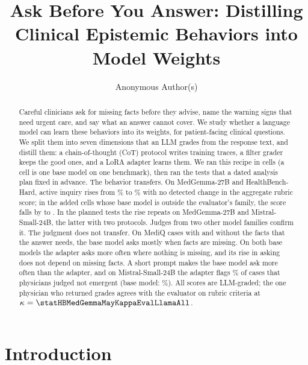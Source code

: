 \documentclass{article}
\title{Ask Before You Answer: Distilling Clinical Epistemic Behaviors into Model Weights}
\author{Anonymous Author(s)}
\newcommand{\hbhard}{HealthBench-Hard}
\begin{document}
\maketitle

\begin{abstract}
Careful clinicians ask for missing facts before they advise, name the warning signs that need
urgent care, and say what an answer cannot cover. We study whether a language model can learn these
behaviors into its weights, for patient-facing clinical questions. We split them into seven
dimensions that an LLM grades from the response text, and distill them: a chain-of-thought (CoT)
protocol writes training traces, a filter grader keeps the good ones, and a LoRA adapter learns
them. We ran this recipe in \statCrossCells{} cells (a cell is one base model on one benchmark), then
ran the tests that a dated analysis plan fixed in advance. The behavior transfers. On MedGemma-27B
and \hbhard{}, active inquiry rises from \statHBMedGemmaMayActiveInquiryBase\% to
\statHBMedGemmaMayActiveInquiryLoRA\% with no detected change in the aggregate rubric score; in the
\statGroupAddedOutsideFamilyRubricScoreLoRAvsBaseMeasured{} added cells whose base model is outside the
evaluator's family, the score falls by \statGroupAddedOutsideFamilyRubricScoreLoRAvsBaseAbsMin{} to
\statGroupAddedOutsideFamilyRubricScoreLoRAvsBaseAbsMax. In
the planned tests the rise repeats on MedGemma-27B and Mistral-Small-24B, the latter with two
protocols. Judges from two other model families confirm it. The judgment does
not transfer. On MediQ cases with and without the facts that the answer needs, the base model asks
mostly when facts are missing. On both base models the adapter asks more often where nothing is
missing, and its rise in asking does not depend on missing facts. A short prompt makes the base model ask more often than the adapter, and on
Mistral-Small-24B the adapter flags \statHBMistralLabelledRedFlagRateEmergentPhysicianNegRateLoRA\%
of cases that physicians judged not emergent (base model:
\statHBMistralLabelledRedFlagRateEmergentPhysicianNegRateBase\%). All scores are LLM-graded; the one physician who returned grades agrees with the evaluator on rubric criteria at $\kappa =
\statHBMedGemmaMayKappaEvalLlamaAll$.
\end{abstract}

\section{Introduction}
\label{sec:intro}
\end{document}
